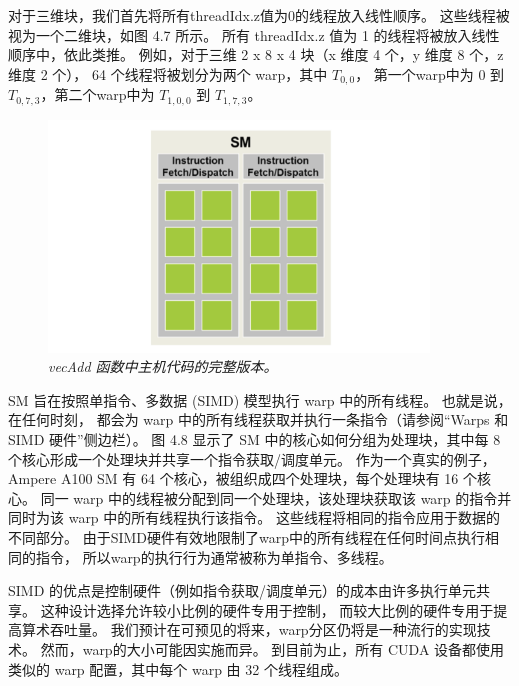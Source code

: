 对于三维块，我们首先将所有threadIdx.z值为0的线程放入线性顺序。 这些线程被视为一个二维块，如图 4.7 所示。 
所有 threadIdx.z 值为 1 的线程将被放入线性顺序中，依此类推。 
例如，对于三维 2 x 8 x 4 块（x 维度 4 个，y 维度 8 个，z 维度 2 个），
64 个线程将被划分为两个 warp，其中 $T_{0,0}$， 
第一个warp中为 0 到 $T_{0,7,3}$，第二个warp中为 $T_{1,0,0}$ 到 $T_{1,7,3}$。

\begin{figure}[H]
	\centering
	\includegraphics[width=0.9\textwidth]{figs/F4.8.png}
	\caption{\textit{\color{red} vecAdd 函数中主机代码的完整版本。}}
\end{figure}

SM 旨在按照单指令、多数据 (SIMD) 模型执行 warp 中的所有线程。 也就是说，在任何时刻，
都会为 warp 中的所有线程获取并执行一条指令（请参阅“Warps 和 SIMD 硬件”侧边栏）。 
图 4.8 显示了 SM 中的核心如何分组为处理块，其中每 8 个核心形成一个处理块并共享一个指令获取/调度单元。 
作为一个真实的例子，Ampere A100 SM 有 64 个核心，被组织成四个处理块，每个处理块有 16 个核心。 
同一 warp 中的线程被分配到同一个处理块，该处理块获取该 warp 的指令并同时为该 warp 中的所有线程执行该指令。 
这些线程将相同的指令应用于数据的不同部分。 由于SIMD硬件有效地限制了warp中的所有线程在任何时间点执行相同的指令，
所以warp的执行行为通常被称为单指令、多线程。

SIMD 的优点是控制硬件（例如指令获取/调度单元）的成本由许多执行单元共享。 这种设计选择允许较小比例的硬件专用于控制，
而较大比例的硬件专用于提高算术吞吐量。 我们预计在可预见的将来，warp分区仍将是一种流行的实现技术。 
然而，warp的大小可能因实施而异。 到目前为止，所有 CUDA 设备都使用类似的 warp 配置，其中每个 warp 由 32 个线程组成。

